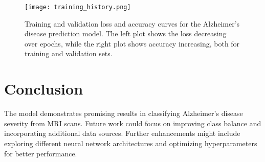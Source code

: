 \documentclass{article}
\begin{document}
\begin{figure}[h!]
    \centering
    \texttt{[image: training\_history.png]}
    \caption{Training and validation loss and accuracy curves for the Alzheimer's disease prediction model. The left plot shows the loss decreasing over epochs, while the right plot shows accuracy increasing, both for training and validation sets.}
    \label{fig:training_curve}
\end{figure}

\section{Conclusion}
The model demonstrates promising results in classifying Alzheimer's disease severity from MRI scans. Future work could focus on improving class balance and incorporating additional data sources. Further enhancements might include exploring different neural network architectures and optimizing hyperparameters for better performance.
\end{document}
